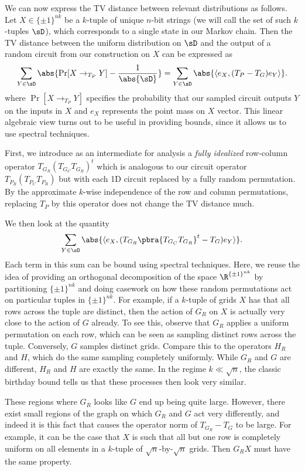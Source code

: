 We can now express the TV distance between relevant distributions as follows. Let $X \in \{\pm 1\}^{nk}$ be a $k$-tuple of unique $n$-bit strings (we will call the set of such $k$-tuples $\sD$), which corresponds to a single state in our Markov chain. Then the TV distance between the uniform distribution on $\sD$ and the output of a random circuit from our construction on $X$ can be expressed as
\begin{align*}
    \sum_{Y \in \sD} \abs{\Pr[X \to_{T_P} Y] - \frac{1}{\abs{\sD}}} = \sum_{Y \in \sD} \abs{\langle e_X, (T_P - T_G) e_Y \rangle}.
\end{align*}
where $\Pr[X \to_{T_P} Y]$ specifies the probability that our sampled circuit outputs $Y$ on the inputs in $X$ and $e_X$ represents the point mass on $X$ vector. This linear algebraic view turns out to be useful in providing bounds, since it allows us to use spectral techniques.

First, we introduce as an intermediate for analysis a \textit{fully idealized} row-column operator $T_{G_R}(T_{G_C}T_{G_R})^t$ which is analogous to our circuit operator $T_{P_R}(T_{P_C}T_{P_R})$ but with each 1D circuit replaced by a fully random permutation. By the approximate $k$-wise independence of the row and column permutations, replacing $T_P$ by this operator does not change the TV distance much.

We then look at the quantity
\begin{align*}
    \sum_{Y\in \sD}\abs{\langle e_X,(T_{G_R}\pbra{T_{G_C}T_{G_R}}^t-T_G)e_Y\rangle }.
\end{align*}
Each term in this sum can be bound using spectral techniques. Here, we reuse the idea of providing an orthogonal decomposition of the space $\R^{\{\pm1\}^{nk}}$ by partitioning $\{\pm1\}^{nk}$ and doing casework on how these random permutations act on particular tuples in $\{\pm1\}^{nk}$. For example, if a $k$-tuple of grids $X$ has that all rows across the tuple are distinct, then the action of $G_R$ on $X$ is actually very close to the action of $G$ already. To see this, observe that $G_R$ applies a uniform permutation on each row, which can be seen as sampling distinct rows across the tuple. Conversely, $G$ samples distinct grids. Compare this to the operators $H_R$ and $H$, which do the same sampling completely uniformly. While $G_R$ and $G$ are different, $H_R$ and $H$ are exactly the same. In the regime $k \ll \sqrt{n}$, the classic birthday bound tells us that these processes then look very similar.

These regions where $G_R$ looks like $G$ end up being quite large. However, there exist small regions of the graph on which $G_R$ and $G$ act very differently, and indeed it is this fact that causes the operator norm of $T_{G_R} - T_G$ to be large. For example, it can be the case that $X$ is such that all but one row is completely uniform on all elements in a $k$-tuple of $\sqrt{n}$-by-$\sqrt{n}$ grids. Then $G_R X$ must have the same property.

